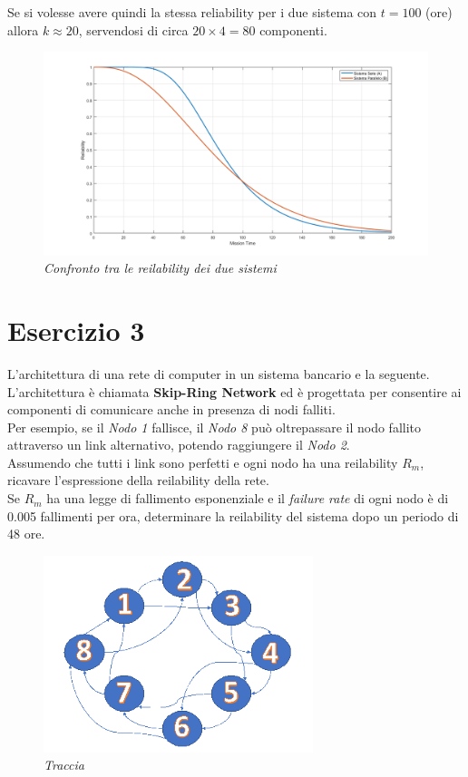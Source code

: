 Se si volesse avere quindi la stessa reliability per i due sistema con $t=100$ (ore) allora $k\approx20$, servendosi di circa $20\times 4 = 80$ componenti.
\begin{figure}[H]
	\centering
	\includegraphics[width=\textwidth]{img/hw5/es2_grafico3.png}
	\caption{\textit{Confronto tra le reilability dei due sistemi}}
\end{figure}

\section{Esercizio 3}
L'architettura di una rete di computer in un sistema bancario e la seguente. L'architettura è chiamata \textbf{Skip-Ring Network} ed è progettata per consentire ai componenti di comunicare anche in presenza di nodi falliti.
\\Per esempio, se il \textit{Nodo 1} fallisce, il \textit{Nodo 8} può oltrepassare il nodo fallito attraverso un link alternativo, potendo raggiungere il \textit{Nodo 2}. 
\\Assumendo che tutti i link sono perfetti e ogni nodo ha una reilability $R_m$, ricavare l'espressione della reilability della rete.
\\Se $R_m$ ha una legge di fallimento esponenziale e il \textit{failure rate} di ogni nodo è di 0.005 fallimenti per ora, determinare la reilability del sistema dopo un periodo di 48 ore.
\begin{figure}[H]
	\centering
\includegraphics[width=0.7\textwidth]{img/hw5/es3_traccia.png}
\caption{\textit{Traccia}}
\end{figure}

